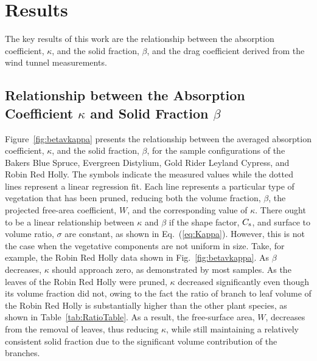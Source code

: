 \documentclass[12pt]{article}
\begin{document}
\pagebreak



\section{Results}
\label{sec:results}

The key results of this work are the relationship between the absorption coefficient, $\kappa$, and the solid fraction, $\beta$, and the drag coefficient derived from the wind tunnel measurements.

\subsection{Relationship between the Absorption Coefficient $\kappa$ and Solid Fraction $\beta$ }

Figure~\ref{fig:betavkappa} presents the relationship between the averaged absorption coefficient, $\kappa$, and the solid fraction, $\beta$, for the sample configurations of the Bakers Blue Spruce, Evergreen Distylium, Gold Rider Leyland Cypress, and Robin Red Holly. The symbols indicate the measured values while the dotted lines represent a linear regression fit. Each line represents a particular type of vegetation that has been pruned, reducing both the volume fraction, $\beta$, the projected free-area coefficient, $W$, and the corresponding value of $\kappa$. There ought to be a linear relationship between $\kappa$ and $\beta$ if the shape factor, $C_{\rm s}$, and surface to volume ratio, $\sigma$ are constant, as shown in Eq.~(\ref{eq:Kappa}). However, this is not the case when the vegetative components are not uniform in size. Take, for example, the Robin Red Holly data shown in Fig.~\ref{fig:betavkappa}. As $\beta$ decreases, $\kappa$ should approach zero, as demonstrated by most samples. As the leaves of the Robin Red Holly were pruned, $\kappa$ decreased significantly even though its volume fraction did not, owing to the fact the ratio of branch to leaf volume of the Robin Red Holly is substantially higher than the other plant species, as shown in Table~\ref{tab:RatioTable}.  As a result, the free-surface area, $W$, decreases from the removal of leaves, thus reducing $\kappa$, while still maintaining a relatively consistent solid fraction due to the significant volume contribution of the branches.
\end{document}

